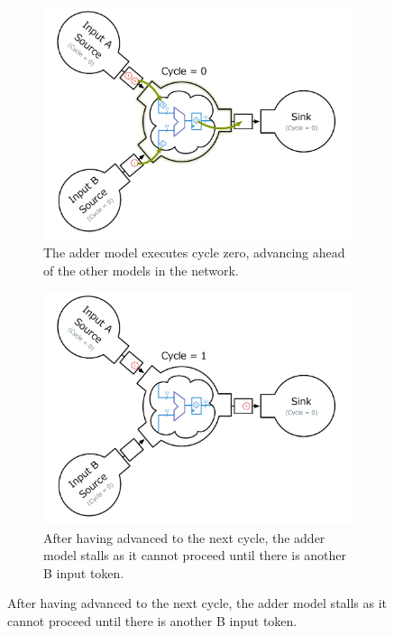 \begin{figure}
    \begin{subfigure}[t]{0.45\textwidth}
	    \centering
        \includegraphics[width=\linewidth]{figures/adder-ex1.pdf}
        \caption{The adder model executes cycle zero, advancing ahead of the other models
        in the network.}
    \end{subfigure}
    \begin{subfigure}[t]{0.45\textwidth}
	    \centering
        \includegraphics[width=\linewidth]{figures/adder-ex2.pdf}
        \caption{After having advanced to the next cycle, the adder model stalls as
        it cannot proceed until there is another B input token.}
    \end{subfigure}

\end{figure}
